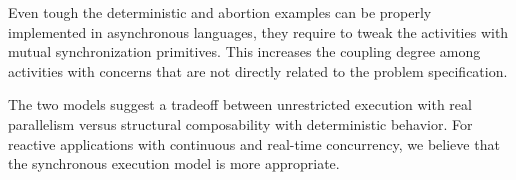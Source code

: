 \documentclass{acm_proc_article-sp}
\newcommand{\1}{\;}
\newcommand{\2}{\;\;}
\newcommand{\3}{\;\;\;}
\newcommand{\5}{\;\;\;\;\;}
\begin{document}

Even tough the deterministic and abortion examples can be properly implemented 
in asynchronous languages, they require to tweak the activities with mutual
synchronization primitives.
%
This increases the coupling degree among activities with concerns that are not 
directly related to the problem specification.

The two models suggest a tradeoff between unrestricted execution with real 
parallelism versus structural composability with deterministic behavior.
%
For reactive applications with continuous and real-time concurrency, we believe 
that the synchronous execution model is more appropriate.

\end{document}
